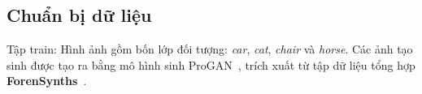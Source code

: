 \subsection{Chuẩn bị dữ liệu}
%
Tập \gls{train}: Hình ảnh gồm bốn lớp đối tượng: \textit{car}, \textit{cat}, \textit{chair} và \textit{horse}. Các ảnh tạo sinh được tạo ra bằng mô hình sinh ProGAN~\cite{karras2018progressive}, trích xuất từ tập dữ liệu tổng hợp \textbf{ForenSynths}~\cite{Wang2019CNNGeneratedIA}.
%
%

